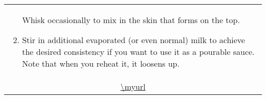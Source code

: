 \documentclass[web-recipes.tex]{subfiles}
\begin{document}
\begin{mdframed}[nobreak]
\begin{tabular}{l}
\begin{minipage}[t]{0.55\textwidth}
\begin{enumerate}
          Whisk occasionally to mix in the skin that forms on the top.
        \item Stir in additional evaporated (or even normal) milk to achieve
          the desired consistency if you want to use it as a pourable sauce.
          Note that when you reheat it, it loosens up.
      \end{enumerate}
    \end{minipage} \vspace{3ex}\\
    \multicolumn{1}{c}{\small\ttfamily \url{\myurl}} \\
  \end{tabular}
\end{mdframed}
\end{document}
